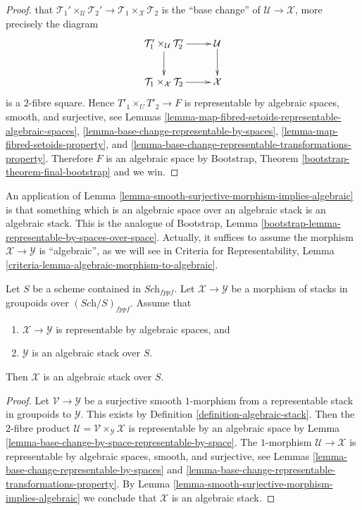 \begin{proof}
that $\mathcal{T}_1' \times_\mathcal{U} \mathcal{T}_2' \to 
\mathcal{T}_1 \times_{\mathcal X} \mathcal{T}_2$
is the ``base change'' of $\mathcal{U} \to \mathcal{X}$, more precisely
the diagram
$$
\xymatrix{
\mathcal{T}_1' \times_\mathcal{U} \mathcal{T}_2' \ar[d] \ar[r] &
\mathcal{U} \ar[d] \\
\mathcal{T}_1 \times_{\mathcal X} \mathcal{T}_2 \ar[r] &
\mathcal{X}
}
$$
is a $2$-fibre square.
Hence $T'_1 \times_U T'_2 \to F$ is representable by algebraic spaces,
smooth, and surjective, see
Lemmas \ref{lemma-map-fibred-setoids-representable-algebraic-spaces},
\ref{lemma-base-change-representable-by-spaces},
\ref{lemma-map-fibred-setoids-property}, and
\ref{lemma-base-change-representable-transformations-property}.
Therefore $F$ is an algebraic space by
Bootstrap, Theorem \ref{bootstrap-theorem-final-bootstrap}
and we win.
\end{proof}

\noindent
An application of
Lemma \ref{lemma-smooth-surjective-morphism-implies-algebraic}
is that something which is an algebraic space over an algebraic stack
is an algebraic stack. This is the analogue of
Bootstrap, Lemma \ref{bootstrap-lemma-representable-by-spaces-over-space}.
Actually, it suffices to assume the morphism
$\mathcal{X} \to \mathcal{Y}$ is ``algebraic'', as we will see in
Criteria for Representability,
Lemma \ref{criteria-lemma-algebraic-morphism-to-algebraic}.

\begin{lemma}
\label{lemma-representable-morphism-to-algebraic} 
Let $S$ be a scheme contained in $\textit{Sch}_{fppf}$. 
Let $\mathcal{X} \to \mathcal{Y}$ be a morphism of stacks in groupoids
over $(\textit{Sch}/S)_{fppf}$. Assume that
\begin{enumerate}
\item $\mathcal{X} \to \mathcal{Y}$ is representable by algebraic spaces, and
\item $\mathcal{Y}$ is an algebraic stack over $S$.
\end{enumerate}
Then $\mathcal{X}$ is an algebraic stack over $S$.
\end{lemma}

\begin{proof}
Let $\mathcal{V} \to \mathcal{Y}$ be a surjective smooth $1$-morphism
from a representable stack in groupoids to $\mathcal{Y}$. This exists by
Definition \ref{definition-algebraic-stack}.
Then the $2$-fibre product
$\mathcal{U} = \mathcal{V} \times_{\mathcal Y} \mathcal X$
is representable by an algebraic space by
Lemma \ref{lemma-base-change-by-space-representable-by-space}.
The $1$-morphism $\mathcal{U} \to \mathcal X$ is representable by algebraic
spaces, smooth, and surjective, see
Lemmas \ref{lemma-base-change-representable-by-spaces} and
\ref{lemma-base-change-representable-transformations-property}.
By
Lemma \ref{lemma-smooth-surjective-morphism-implies-algebraic}
we conclude that $\mathcal{X}$ is an algebraic stack.  
\end{proof}

